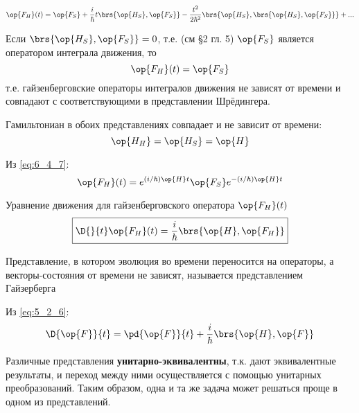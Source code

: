 \begin{equation}
\label{eq:6_4_8}
\op{F_H}(t) = \op{F_S} + \frac{i}{\hbar} t \brs{\op{H_S}, \op{F_S}} - \frac{t^2}{2\hbar^2} \brs{\op{H_S}, \brs{\op{H_S}, \op{F_S}}} + ...
\end{equation}

Если $\brs{\op{H_S}, \op{F_S}} = 0$, т.е. (см \S 2 гл. 5) $\op{F_S}$ является оператором интеграла движения, то
$$
\op{F_H}(t) = \op{F_S}
$$
т.е. гайзенберговские операторы интегралов движения не зависят от времени и совпадают с соответствующими в представлении Шрёдингера.

Гамильтониан в обоих представлениях совпадает и не зависит от времени:
$$
\op{H_H} = \op{H_S} = \op{H}
$$

Из \eqref{eq:6_4_7}:
\begin{equation}
\label{eq:6_4_9}
\op{F_H}(t) = e^{(i/\hbar)\op{H}t} \op{F_S} e^{-(i/\hbar)\op{H}t}
\end{equation}

Уравнение движения для гайзенберговского оператора $\op{F_H}(t)$
\begin{equation}
\label{eq:6_4_10}
\boxed{
	\D{}{t}\op{F_H}(t) = \frac{i}{\hbar} \brs{\op{H}, \op{F_H}}
}
\end{equation}

\begin{defn}
Представление, в котором эволюция во времени переносится на операторы, а векторы-состояния от времени не зависят, называется представлением Гайзерберга
\end{defn}

Из \eqref{eq:5_2_6}:
$$
\D{\op{F}}{t} = \pd{\op{F}}{t} + \frac{i}{\hbar} \brs{\op{H}, \op{F}}
$$

Различные представления \textbf{унитарно-эквивалентны}, т.к. дают эквивалентные результаты, и переход между ними осуществляется с помощью унитарных преобразований. Таким образом, одна и та же задача может решаться проще в одном из представлений.
